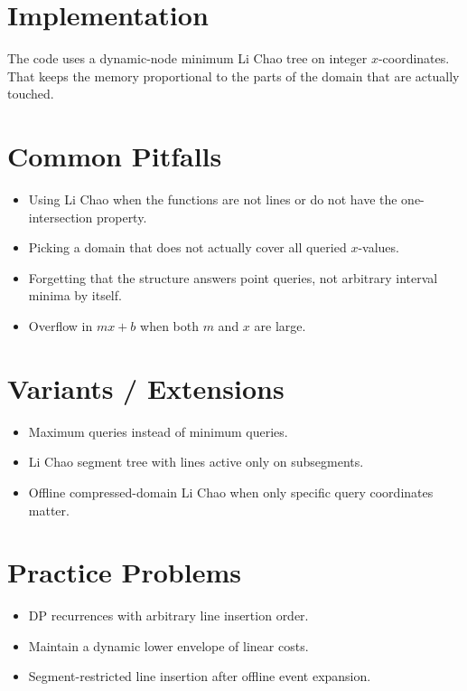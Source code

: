 \section*{Implementation}

The code uses a dynamic-node minimum Li Chao tree on integer \(x\)-coordinates. That keeps the memory proportional to
the parts of the domain that are actually touched.

\section*{Common Pitfalls}

\begin{itemize}
  \item Using Li Chao when the functions are not lines or do not have the one-intersection property.
  \item Picking a domain that does not actually cover all queried \(x\)-values.
  \item Forgetting that the structure answers point queries, not arbitrary interval minima by itself.
  \item Overflow in \(mx + b\) when both \(m\) and \(x\) are large.
\end{itemize}

\section*{Variants / Extensions}

\begin{itemize}
  \item Maximum queries instead of minimum queries.
  \item Li Chao segment tree with lines active only on subsegments.
  \item Offline compressed-domain Li Chao when only specific query coordinates matter.
\end{itemize}

\section*{Practice Problems}

\begin{itemize}
  \item DP recurrences with arbitrary line insertion order.
  \item Maintain a dynamic lower envelope of linear costs.
  \item Segment-restricted line insertion after offline event expansion.
\end{itemize}

